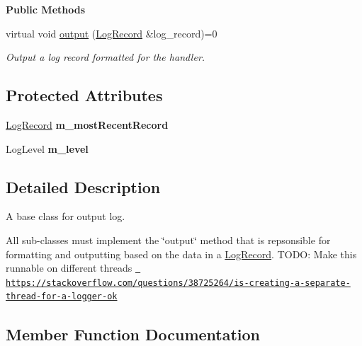 \begin{Indent}\textbf{ Public Methods}\par
\begin{DoxyCompactItemize}
\item 
virtual void \mbox{\hyperlink{classrev_1_1_abstract_log_handler_a0154255c9435f0ee66975be2d450b177}{output}} (\mbox{\hyperlink{classrev_1_1_log_record}{Log\+Record}} \&log\+\_\+record)=0
\begin{DoxyCompactList}\small\item\em Output a log record formatted for the handler. \end{DoxyCompactList}\end{DoxyCompactItemize}
\end{Indent}
\subsection*{Protected Attributes}
\begin{DoxyCompactItemize}
\item 
\mbox{\label{classrev_1_1_abstract_log_handler_a64ac93afd1539f30b75d9ae09b123cae}} 
\mbox{\hyperlink{classrev_1_1_log_record}{Log\+Record}} {\bfseries m\+\_\+most\+Recent\+Record}
\item 
\mbox{\label{classrev_1_1_abstract_log_handler_a49948c5299b258da791bb73c2e70eb6f}} 
Log\+Level {\bfseries m\+\_\+level}
\end{DoxyCompactItemize}


\subsection{Detailed Description}
A base class for output log. 

All sub-\/classes must implement the \char`\"{}output\char`\"{} method that is repsonsible for formatting and outputting based on the data in a \mbox{\hyperlink{classrev_1_1_log_record}{Log\+Record}}. T\+O\+DO\+: Make this runnable on different threads \href{https://stackoverflow.com/questions/38725264/is-creating-a-separate-thread-for-a-logger-ok}{\texttt{ https\+://stackoverflow.\+com/questions/38725264/is-\/creating-\/a-\/separate-\/thread-\/for-\/a-\/logger-\/ok}} 

\subsection{Member Function Documentation}
\mbox{\label{classrev_1_1_abstract_log_handler_a0154255c9435f0ee66975be2d450b177}} 
